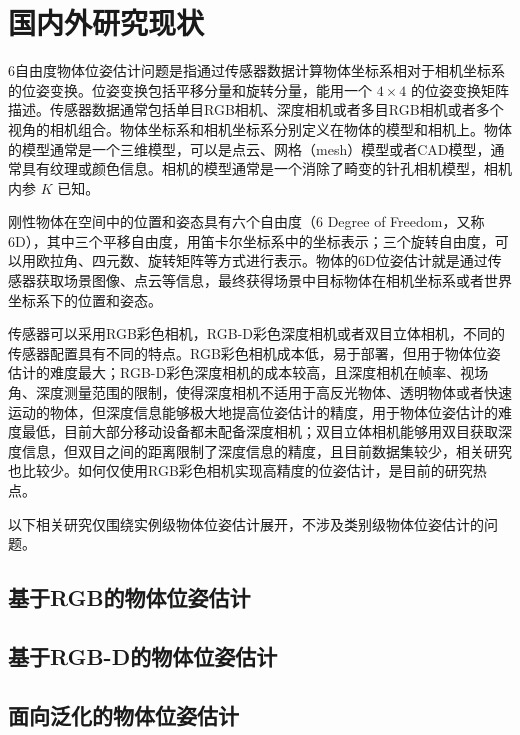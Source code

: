 \chapter{国内外研究现状}
\par 6自由度物体位姿估计问题是指通过传感器数据计算物体坐标系相对于相机坐标系的位姿变换。位姿变换包括平移分量和旋转分量，能用一个 $4\times 4$ 的位姿变换矩阵描述。传感器数据通常包括单目RGB相机、深度相机或者多目RGB相机或者多个视角的相机组合。物体坐标系和相机坐标系分别定义在物体的模型和相机上。物体的模型通常是一个三维模型，可以是点云、网格（mesh）模型或者CAD模型，通常具有纹理或颜色信息。相机的模型通常是一个消除了畸变的针孔相机模型，相机内参 $K$ 已知。
\par 刚性物体在空间中的位置和姿态具有六个自由度（6 Degree of Freedom，又称6D），其中三个平移自由度，用笛卡尔坐标系中的坐标表示；三个旋转自由度，可以用欧拉角、四元数、旋转矩阵等方式进行表示。物体的6D位姿估计就是通过传感器获取场景图像、点云等信息，最终获得场景中目标物体在相机坐标系或者世界坐标系下的位置和姿态。
\par 传感器可以采用RGB彩色相机，RGB-D彩色深度相机或者双目立体相机，不同的传感器配置具有不同的特点。RGB彩色相机成本低，易于部署，但用于物体位姿估计的难度最大；RGB-D彩色深度相机的成本较高，且深度相机在帧率、视场角、深度测量范围的限制，使得深度相机不适用于高反光物体、透明物体或者快速运动的物体，但深度信息能够极大地提高位姿估计的精度，用于物体位姿估计的难度最低，目前大部分移动设备都未配备深度相机；双目立体相机能够用双目获取深度信息，但双目之间的距离限制了深度信息的精度，且目前数据集较少，相关研究也比较少。如何仅使用RGB彩色相机实现高精度的位姿估计，是目前的研究热点。

以下相关研究仅围绕实例级物体位姿估计展开，不涉及类别级物体位姿估计的问题。
\section{基于RGB的物体位姿估计}

\section{基于RGB-D的物体位姿估计}

\section{面向泛化的物体位姿估计}
